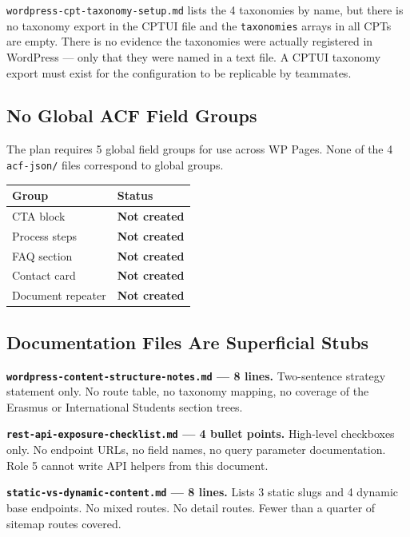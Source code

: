 \documentclass[12pt,a4paper]{article}
\begin{document}
\texttt{wordpress-cpt-taxonomy-setup.md} lists the 4 taxonomies by name, but there is no
taxonomy export in the CPTUI file and the \texttt{taxonomies} arrays in all CPTs are empty.
There is no evidence the taxonomies were actually registered in WordPress --- only that they
were named in a text file. A CPTUI taxonomy export must exist for the configuration to be
replicable by teammates.

\subsection{No Global ACF Field Groups}

The plan requires 5 global field groups for use across WP Pages. None of the 4
\texttt{acf-json/} files correspond to global groups.

\vspace{0.4em}
\begin{tabular}{@{}p{4cm}p{8.3cm}@{}}
\toprule
\rowcolor{uvtLightBlue}
\textbf{Group} & \textbf{Status} \\
\midrule
CTA block & \textcolor{statusRed}{\textbf{Not created}} \\
Process steps & \textcolor{statusRed}{\textbf{Not created}} \\
FAQ section & \textcolor{statusRed}{\textbf{Not created}} \\
Contact card & \textcolor{statusRed}{\textbf{Not created}} \\
Document repeater & \textcolor{statusRed}{\textbf{Not created}} \\
\bottomrule
\end{tabular}

\subsection{Documentation Files Are Superficial Stubs}

\noindent\textbf{\texttt{wordpress-content-structure-notes.md} --- 8 lines.}
Two-sentence strategy statement only. No route table, no taxonomy mapping, no coverage of
the Erasmus or International Students section trees.

\vspace{0.5em}
\noindent\textbf{\texttt{rest-api-exposure-checklist.md} --- 4 bullet points.}
High-level checkboxes only. No endpoint URLs, no field names, no query parameter
documentation. Role 5 cannot write API helpers from this document.

\vspace{0.5em}
\noindent\textbf{\texttt{static-vs-dynamic-content.md} --- 8 lines.}
Lists 3 static slugs and 4 dynamic base endpoints. No mixed routes. No detail routes.
Fewer than a quarter of sitemap routes covered.
\end{document}
